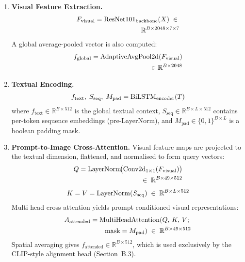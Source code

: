 \begin{enumerate}[leftmargin=*, label=\textbf{\arabic*.}]

\item \textbf{Visual Feature Extraction.}
\begin{equation}
\begin{aligned}
    F_{\text{visual}} = \text{ResNet101}_{\text{backbone}}(X)
    \;\in\; \\ \mathbb{R}^{B \times 2048 \times 7 \times 7} \notag
\end{aligned}
\end{equation}
A global average-pooled vector is also computed: 
\[
\begin{aligned}
f_{\text{global}} = \operatorname{AdaptiveAvgPool2d}(F_{\text{visual}}) \\ \in \mathbb{R}^{B \times 2048} \notag
\end{aligned}
\]

\item \textbf{Textual Encoding.}
\begin{equation}
    f_{\text{text}},\; S_{\text{seq}},\; M_{\text{pad}}
    = \text{BiLSTM}_{\text{encoder}}(T) \notag
\end{equation}
where $f_{\text{text}} \in \mathbb{R}^{B \times 512}$ is the global textual
context, $S_{\text{seq}} \in \mathbb{R}^{B \times L \times 512}$ contains
per-token sequence embeddings (pre-LayerNorm), and
$M_{\text{pad}} \in \{0,1\}^{B \times L}$ is a boolean padding mask.

\item \textbf{Prompt-to-Image Cross-Attention.}
Visual feature maps are projected to the textual dimension, flattened, and
normalised to form query vectors:
\begin{equation}
\begin{aligned}
    Q = \operatorname{LayerNorm}\!\bigl(\operatorname{Conv2d}_{1\times1}(F_{\text{visual}})\bigr) \\
    \;\in\; \mathbb{R}^{B \times 49 \times 512} \notag
\end{aligned}
\end{equation}
\begin{equation}
    K = V = \operatorname{LayerNorm}(S_{\text{seq}})
    \;\in\; \mathbb{R}^{B \times L \times 512} \notag
\end{equation}
Multi-head cross-attention yields prompt-conditioned visual representations:
\begin{equation}
\begin{aligned}
    A_{\text{attended}}
    = \operatorname{MultiHeadAttention}(Q,\,K,\,V;\; \\ \text{mask}=M_{\text{pad}})
    \;\in\; \mathbb{R}^{B \times 49 \times 512} \notag
\end{aligned}
\end{equation}
Spatial averaging gives $f_{\text{attended}} \in \mathbb{R}^{B \times 512}$,
which is used exclusively by the CLIP-style alignment head (Section~B.3).

\end{enumerate}

